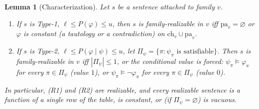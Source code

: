 \documentclass{article} %
\newtheorem{lemma}{Lemma}
\newcommand{\ch}{\mathrm{ch}}
\newcommand{\pa}{\mathrm{pa}}
\begin{document}
\begin{lemma}[Characterization]\label{lem:invariance}
Let $s$ be a sentence attached to family $v$.
\begin{enumerate}
  \item[\textup{(i)}] If $s$ is Type-1, $\ell\le P(\varphi)\le u$, then $s$ is family-realizable in
    $v$ iff $\pa_v=\varnothing$ or $\varphi$ is constant (a tautology or a contradiction) on
    $\ch_v\cup\pa_v$.
  \item[\textup{(ii)}] If $s$ is Type-2, $\ell\le P(\varphi\mid\psi)\le u$, let
    $\Pi_\psi=\{\pi:\psi_\pi\text{ is satisfiable}\}$. Then $s$ is family-realizable in $v$ iff
    $|\Pi_\psi|\le1$, or the conditional value is forced: $\psi_\pi\models\varphi_\pi$ for every
    $\pi\in\Pi_\psi$ (value $1$), or $\psi_\pi\models\lnot\varphi_\pi$ for every $\pi\in\Pi_\psi$
    (value $0$).
\end{enumerate}
In particular, (R1) and (R2) are realizable, and every realizable sentence is a function of a single
row of the table, is constant, or (if $\Pi_\psi=\varnothing$) is vacuous.
\end{lemma}
\end{document}
